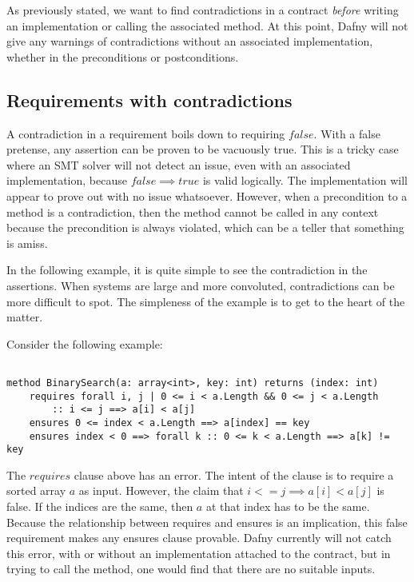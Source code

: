 \documentclass{article}
\begin{document}
As previously stated, we want to find contradictions in a contract {\it before} writing an implementation or calling the associated method. 
At this point, Dafny will not give any warnings of contradictions without an associated implementation, whether in the preconditions or postconditions. 

 \subsection*{Requirements with contradictions}

 A contradiction in a requirement boils down to requiring
 \(false\). With a false pretense, any assertion can be proven to be vacuously true. This is a tricky case
 where an SMT solver will not detect an issue, even with an associated implementation, because \(false \implies true\) is valid logically. The implementation
 will appear to prove out with no issue whatsoever. However, when 
 a precondition to a method is a contradiction, then the method cannot be called in any context because the precondition is 
 always violated, which can be a teller that something is amiss.

 In the following example, it is quite simple to see the contradiction in the assertions. When systems are large and more
convoluted, contradictions can be more difficult to spot. The simpleness of the example is to get to the heart of the matter.

Consider the following example:

\begin{lstlisting}

method BinarySearch(a: array<int>, key: int) returns (index: int)
    requires forall i, j | 0 <= i < a.Length && 0 <= j < a.Length
        :: i <= j ==> a[i] < a[j]
    ensures 0 <= index < a.Length ==> a[index] == key
    ensures index < 0 ==> forall k :: 0 <= k < a.Length ==> a[k] != key

\end{lstlisting}

The \(requires\) clause above has an error. The intent of the clause is to require a sorted array \(a\) as input.
However, the claim that \(i <= j \implies a[i] < a[j]\) is false. If the indices are the same, then \(a\) at that
index has to be the same. Because the relationship between requires and ensures is an implication, this false requirement
makes any ensures clause provable. Dafny currently will not catch this error, with or without an implementation attached to
the contract, but in trying to call the method, one would find that there are no suitable inputs.  
\end{document}

